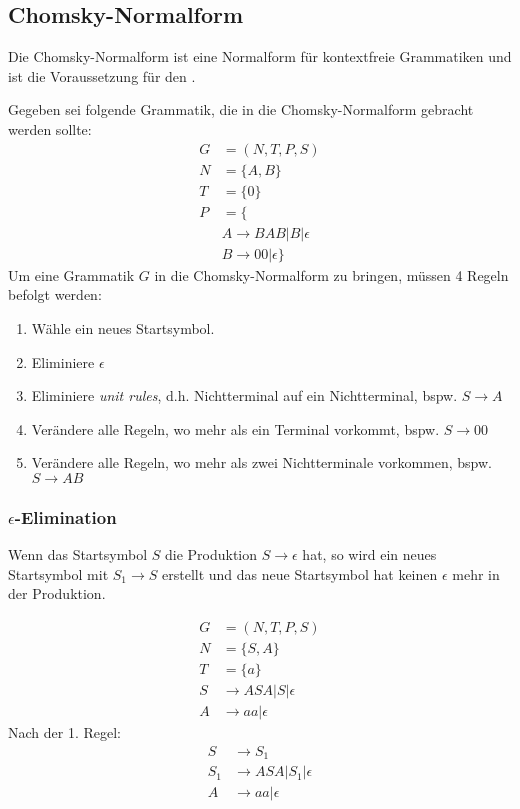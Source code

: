\subsection{Chomsky-Normalform}
\label{cnf}
\begin{definition}
    Die Chomsky-Normalform ist eine Normalform für kontextfreie Grammatiken und ist die Voraussetzung für den .
\end{definition}

Gegeben sei folgende Grammatik, die in die Chomsky-Normalform gebracht werden sollte:
\begin{align*}
    G&=(N,T,P,S)\\
    N&=\{A,B\}\\
    T&=\{0\}\\
    P&=\{\\
    &A\to BAB|B|\epsilon\\
    &B\to 00|\epsilon    
    \}
\end{align*}
Um eine Grammatik $G$ in die Chomsky-Normalform zu bringen, müssen 4 Regeln befolgt werden:
\begin{enumerate}
    \item Wähle ein neues Startsymbol.
    \item Eliminiere $\epsilon$
    \item Eliminiere \textit{unit rules}, d.h. Nichtterminal auf ein Nichtterminal, bspw. $S\to A$
    \item Verändere alle Regeln, wo mehr als ein Terminal vorkommt, bspw. $S\to 00$
    \item Verändere alle Regeln, wo mehr als zwei Nichtterminale vorkommen, bspw. $S\to AB$
\end{enumerate}
\iffalse
\subsubsection[Epsilon-Elimination]{$\epsilon$-Elimination}
Wenn das Startsymbol $S$ die Produktion $S\to \epsilon$ hat, so wird ein neues Startsymbol mit $S_1 \to S$ erstellt und das neue Startsymbol hat keinen $\epsilon$ mehr in der Produktion.\par

\begin{align*}
    G&=(N,T,P,S)\\
    N&=\{S,A\}\\
    T&=\{a\}\\
    S&\to ASA|S|\epsilon\\
    A&\to aa|\epsilon
\end{align*}
Nach der 1. Regel:
\begin{align*}
    S&\to S_1\\
    S_1&\to ASA|S_1|\epsilon\\
    A&\to aa|\epsilon
\end{align*}


